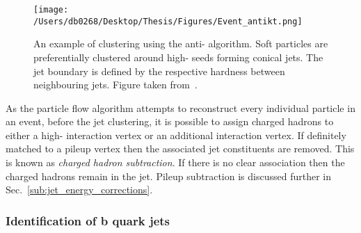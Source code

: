 \begin{figure}[htpb]
	\centering
	\texttt{[image: /Users/db0268/Desktop/Thesis/Figures/Event\_antikt.png]}
	\caption[An example of clustering using the anti-\kt{} algorithm. Soft particles are preferentially clustered around high-\pt{} seeds forming conical jets. The jet boundary is defined by the respective hardness between neighbouring jets.]{An example of clustering using the anti-\kt{} algorithm. Soft particles are preferentially clustered around high-\pt{} seeds forming conical jets. The jet boundary is defined by the respective hardness between neighbouring jets. Figure taken from~\cite{Event:antikt}.}
	\label{fig:antikt}
\end{figure}

As the particle flow algorithm attempts to reconstruct every individual particle in an event, before the jet clustering, it is possible to assign charged hadrons to either a high-\pt{} interaction vertex or an additional interaction vertex.
If definitely matched to a pileup vertex then the associated jet constituents are removed.
This is known as \textit{charged hadron subtraction}.
If there is no clear association then the charged hadrons remain in the jet.
Pileup subtraction is discussed further in Sec.~\ref{sub:jet_energy_corrections}.

\subsubsection{Identification of b quark jets} %
\label{ssub:bqj}

